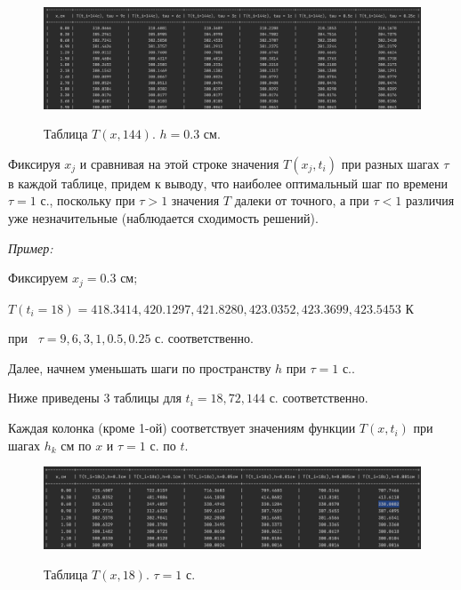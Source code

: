 \documentclass[a4paper,12pt]{article}
\begin{document}
	\newpage

	\begin{figure}[h!]
		\begin{center}
			{\includegraphics[scale = 0.4]{144.png}}
			\label{table:144}
		\end{center}
		\caption{Таблица $T(x, 144)$. $h = 0.3$ см.}
	\end{figure}

	Фиксируя $x_j$ и сравнивая на этой строке значения $T(x_j, t_i)$ при разных шагах $\tau$ в каждой таблице, придем к выводу, что наиболее оптимальный шаг по времени $\tau = 1$ с., поскольку при $\tau > 1$ значения $T$ далеки от точного, а при $\tau < 1$ различия уже незначительные (наблюдается сходимость решений).
	
	\textit{Пример:}
	
	Фиксируем $x_j = 0.3$ см; 
	
	$T(t_i = 18) = 418.3414, 420.1297, 421.8280, 423.0352, 423.3699, 423.5453$ К 
	
	при  $\tau = 9, 6, 3, 1, 0.5, 0.25$ с. соответственно.
	
	\vspace*{20mm} 
	
	Далее, начнем уменьшать шаги по пространству $h$ при $\tau = 1$ с..
	
	Ниже приведены 3 таблицы для $t_i = 18, 72, 144$ с. соответственно.
	
	Каждая колонка (кроме 1-ой) соответствует значениям функции $T(x, t_i)$ при шагах $h_k$ см по $x$ и $\tau = 1$ с. по $t$.
	
	\begin{figure}[h!]
		\begin{center}
			{\includegraphics[scale = 0.45]{18_2.png}}
			\label{table:18_2}
		\end{center}
		\caption{Таблица $T(x, 18)$. $\tau = 1$ с.}
	\end{figure}
\end{document}
